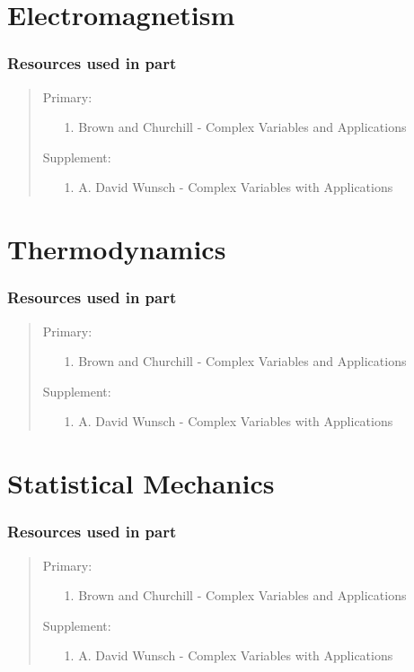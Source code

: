 \documentclass[12pt, english]{book}
\newenvironment{partintro}
{\vspace*{\fill}
	\section*{\centering Resources used in part \thepart}
	\begin{quotation}}
	{\end{quotation}\vspace*{\fill}\newpage}
\begin{document}
	\part{Electromagnetism} \label{Electromagnetism Part}
	\begin{partintro}
		\noindent Primary:
		\begin{itemize}
			\item[1.] Brown and Churchill - Complex Variables and Applications
		\end{itemize}
		Supplement: 
		\begin{itemize}
			\item[1.] A. David Wunsch - Complex Variables with Applications
		\end{itemize}
	\end{partintro}

	\part{Thermodynamics} \label{Thermodynamics Part}
	\begin{partintro}
		\noindent Primary:
		\begin{itemize}
			\item[1.] Brown and Churchill - Complex Variables and Applications
		\end{itemize}
		Supplement: 
		\begin{itemize}
			\item[1.] A. David Wunsch - Complex Variables with Applications
		\end{itemize}
	\end{partintro}

	\part{Statistical Mechanics} \label{Statistical Mechanics Part}
	\begin{partintro}
		\noindent Primary:
		\begin{itemize}
			\item[1.] Brown and Churchill - Complex Variables and Applications
		\end{itemize}
		Supplement: 
		\begin{itemize}
			\item[1.] A. David Wunsch - Complex Variables with Applications
		\end{itemize}
	\end{partintro}
\end{document}

